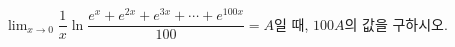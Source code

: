 $\displaystyle\lim_{x\to 0}\dfrac{1}{x}\ln\dfrac{e^x+e^{2x}+e^{3x}+\cdots+e^{100x}}{100}=A$일 때, $100A$의 값을 구하시오.
